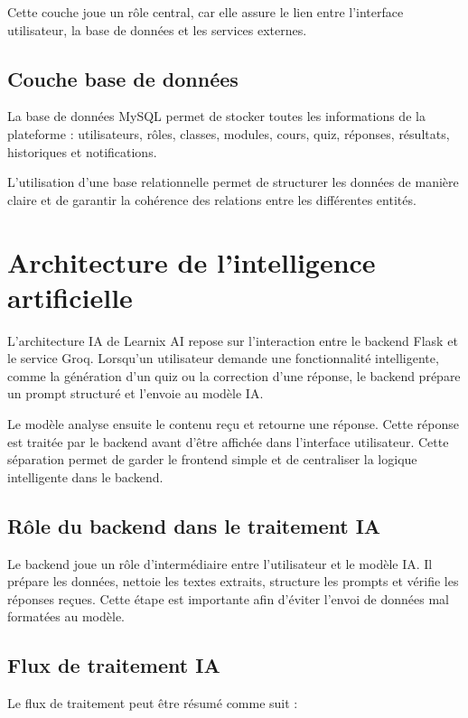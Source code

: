 \documentclass[12pt,a4paper]{report}
\begin{document}
Cette couche joue un rôle central, car elle assure le lien entre l'interface
utilisateur, la base de données et les services externes.

\subsection{Couche base de données}

La base de données MySQL permet de stocker toutes les informations de la
plateforme : utilisateurs, rôles, classes, modules, cours, quiz, réponses,
résultats, historiques et notifications.

L'utilisation d'une base relationnelle permet de structurer les données de
manière claire et de garantir la cohérence des relations entre les différentes
entités.

\section{Architecture de l'intelligence artificielle}

L'architecture IA de Learnix AI repose sur l'interaction entre le backend Flask
et le service Groq. Lorsqu'un utilisateur demande une fonctionnalité intelligente,
comme la génération d'un quiz ou la correction d'une réponse, le backend prépare
un prompt structuré et l'envoie au modèle IA.

Le modèle analyse ensuite le contenu reçu et retourne une réponse. Cette réponse
est traitée par le backend avant d'être affichée dans l'interface utilisateur.
Cette séparation permet de garder le frontend simple et de centraliser la
logique intelligente dans le backend.

\subsection{Rôle du backend dans le traitement IA}

Le backend joue un rôle d'intermédiaire entre l'utilisateur et le modèle IA. Il
prépare les données, nettoie les textes extraits, structure les prompts et
vérifie les réponses reçues. Cette étape est importante afin d'éviter l'envoi de
données mal formatées au modèle.

\subsection{Flux de traitement IA}

Le flux de traitement peut être résumé comme suit :
\end{document}
